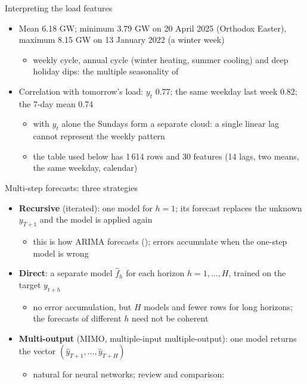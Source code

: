 \begin{frame}{Interpreting the load features}
\itemsize{\small}
\begin{itemize}
    \item Mean 6.18 GW; minimum 3.79 GW on 20 April 2025 (Orthodox Easter), maximum 8.15 GW on 13 January 2022 (a winter week)
    \begin{itemize}
        \item weekly cycle, annual cycle (winter heating, summer cooling) and deep holiday dips: the multiple seasonality of 
    \end{itemize}
    \item Correlation with tomorrow's load: $y_t$ 0.77; the same weekday last week 0.82; the 7-day mean 0.74
    \begin{itemize}
        \item with $y_t$ alone the Sundays form a separate cloud: a single linear lag cannot represent the weekly pattern
        \item the table used below has 1\,614 rows and 30 features (14 lags, two means, the same weekday, calendar)
    \end{itemize}
\end{itemize}
\end{frame}

\begin{frame}{Multi-step forecasts: three strategies}
\itemsize{\small}
\begin{itemize}
    \item \textbf{Recursive} (iterated): one model for $h = 1$; its forecast replaces the unknown $y_{T+1}$ and the model is applied again
    \begin{itemize}
        \item this is how ARIMA forecasts (); errors accumulate when the one-step model is wrong
    \end{itemize}
    \item \textbf{Direct}: a separate model $\hat f_h$ for each horizon $h = 1, \dots, H$, trained on the target $y_{t+h}$
    \begin{itemize}
        \item no error accumulation, but $H$ models and fewer rows for long horizons; the forecasts of different $h$ need not be coherent
    \end{itemize}
    \item \textbf{Multi-output} (MIMO, multiple-input multiple-output): one model returns the vector $(\hat y_{T+1}, \dots, \hat y_{T+H})$
    \begin{itemize}
        \item natural for neural networks; review and comparison: 
    \end{itemize}
\end{itemize}
\end{frame}

